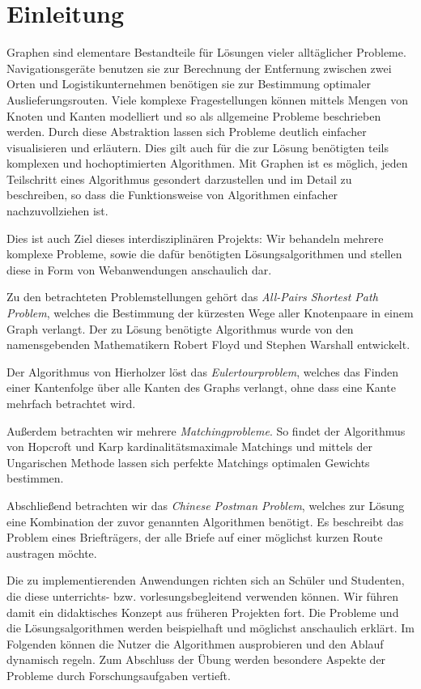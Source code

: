 \chapter{Einleitung} %
Graphen sind elementare Bestandteile für Lösungen vieler alltäglicher Probleme. Navigationsgeräte benutzen sie zur Berechnung der Entfernung zwischen zwei Orten und Logistikunternehmen benötigen sie zur Bestimmung optimaler Auslieferungsrouten. Viele komplexe Fragestellungen können mittels Mengen von Knoten und Kanten modelliert und so als allgemeine Probleme beschrieben werden. Durch diese Abstraktion lassen sich Probleme deutlich einfacher visualisieren und erläutern. Dies gilt auch für die zur Lösung benötigten teils komplexen und hochoptimierten Algorithmen. Mit Graphen ist es möglich, jeden Teilschritt eines Algorithmus gesondert darzustellen und im Detail zu beschreiben, so dass die Funktionsweise von Algorithmen einfacher nachzuvollziehen ist.

Dies ist auch Ziel dieses interdisziplinären Projekts: Wir behandeln mehrere komplexe Probleme, sowie die dafür benötigten Lösungsalgorithmen und stellen diese in Form von Webanwendungen anschaulich dar.

Zu den betrachteten Problemstellungen gehört das \textit{All-Pairs Shortest Path Problem}, welches die Bestimmung der kürzesten Wege aller Knotenpaare in einem Graph verlangt. Der zu Lösung benötigte Algorithmus wurde von den namensgebenden Mathematikern Robert Floyd und Stephen Warshall entwickelt.

Der Algorithmus von Hierholzer löst das \textit{Eulertourproblem}, welches das Finden einer Kantenfolge über alle Kanten des Graphs verlangt, ohne dass eine Kante mehrfach betrachtet wird.

Außerdem betrachten wir mehrere \textit{Matchingprobleme}. So findet der Algorithmus von Hopcroft und Karp kardinalitätsmaximale Matchings und mittels der Ungarischen Methode lassen sich perfekte Matchings optimalen Gewichts bestimmen. 

Abschließend betrachten wir das \textit{Chinese Postman Problem}, welches zur Lösung eine Kombination der zuvor genannten Algorithmen benötigt. Es beschreibt das Problem eines Briefträgers, der alle Briefe auf einer möglichst kurzen Route austragen möchte.

Die zu implementierenden Anwendungen richten sich an Schüler und Studenten, die diese unterrichts- bzw. vorlesungsbegleitend verwenden können. Wir führen damit ein didaktisches Konzept aus früheren Projekten fort. Die Probleme und die Lösungsalgorithmen werden beispielhaft und möglichst anschaulich erklärt. Im Folgenden können die Nutzer die Algorithmen ausprobieren und den Ablauf dynamisch regeln. Zum Abschluss der Übung werden besondere Aspekte der Probleme durch Forschungsaufgaben vertieft.

